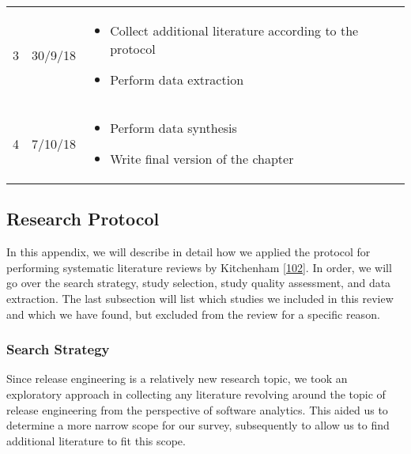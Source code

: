 \documentclass[]{book}
\providecommand{\tightlist}{%
  \setlength{\itemsep}{0pt}\setlength{\parskip}{0pt}}
\begin{document}
\begin{longtable}[]{@{}lll@{}}
\begin{minipage}[t]{0.32\columnwidth}
3\strut
\end{minipage} & \begin{minipage}[t]{0.32\columnwidth}\raggedright\strut
30/9/18\strut
\end{minipage} & \begin{minipage}[t]{0.32\columnwidth}\raggedright\strut
\begin{itemize}
\tightlist
\item
  Collect additional literature according to the protocol
\item
  Perform data extraction
\end{itemize}\strut
\end{minipage}\tabularnewline
\begin{minipage}[t]{0.32\columnwidth}\raggedright\strut
4\strut
\end{minipage} & \begin{minipage}[t]{0.32\columnwidth}\raggedright\strut
7/10/18\strut
\end{minipage} & \begin{minipage}[t]{0.32\columnwidth}\raggedright\strut
\begin{itemize}
\tightlist
\item
  Perform data synthesis
\item
  Write final version of the chapter
\end{itemize}\strut
\end{minipage}\tabularnewline
\bottomrule
\end{longtable}

\subsection{Research Protocol}\label{research-protocol-6}

In this appendix, we will describe in detail how we applied the protocol
for performing systematic literature reviews by Kitchenham
{[}\protect\hyperlink{ref-kitchenham2004procedures}{102}{]}. In order,
we will go over the search strategy, study selection, study quality
assessment, and data extraction. The last subsection will list which
studies we included in this review and which we have found, but excluded
from the review for a specific reason.

\subsubsection{Search Strategy}\label{search-strategy-2}

Since release engineering is a relatively new research topic, we took an
exploratory approach in collecting any literature revolving around the
topic of release engineering from the perspective of software analytics.
This aided us to determine a more narrow scope for our survey,
subsequently to allow us to find additional literature to fit this
scope.
\end{document}

